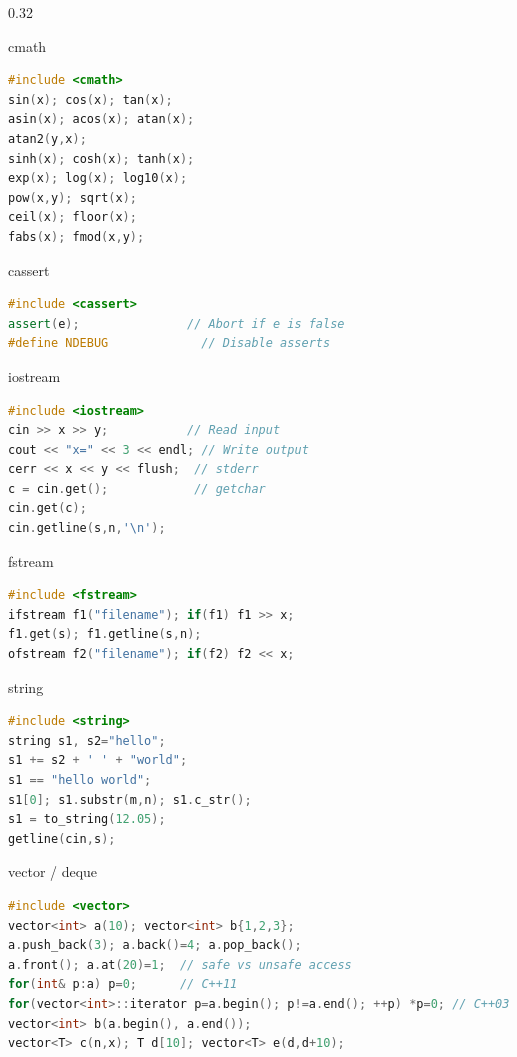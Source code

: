 \documentclass[final]{beamer}
\begin{document}
\begin{frame}[t,fragile]
\begin{columns}[t,totalwidth=\paperwidth, colsep=0.015\paperwidth]
\begin{column}{0.32\paperwidth}
\begin{block}{cmath}
\begin{lstlisting}[language=C++]
#include <cmath>
sin(x); cos(x); tan(x);
asin(x); acos(x); atan(x);
atan2(y,x);
sinh(x); cosh(x); tanh(x);
exp(x); log(x); log10(x);
pow(x,y); sqrt(x);
ceil(x); floor(x);
fabs(x); fmod(x,y);
\end{lstlisting}


\end{block}



\begin{block}{cassert}
\begin{lstlisting}[language=C++]
#include <cassert>
assert(e);               // Abort if e is false
#define NDEBUG             // Disable asserts
\end{lstlisting}
\end{block}

\begin{block}{iostream}
\begin{lstlisting}[language=C++]
#include <iostream>
cin >> x >> y;           // Read input
cout << "x=" << 3 << endl; // Write output
cerr << x << y << flush;  // stderr
c = cin.get();            // getchar
cin.get(c);
cin.getline(s,n,'\n');
\end{lstlisting}
\end{block}

\begin{block}{fstream}
\begin{lstlisting}[language=C++]
#include <fstream>
ifstream f1("filename"); if(f1) f1 >> x;
f1.get(s); f1.getline(s,n);
ofstream f2("filename"); if(f2) f2 << x;
\end{lstlisting}
\end{block}

\begin{block}{string}
\begin{lstlisting}[language=C++]
#include <string>
string s1, s2="hello";
s1 += s2 + ' ' + "world";
s1 == "hello world";
s1[0]; s1.substr(m,n); s1.c_str();
s1 = to_string(12.05);
getline(cin,s);
\end{lstlisting}
\end{block}

\begin{block}{vector / deque}
\begin{lstlisting}[language=C++]
#include <vector>
vector<int> a(10); vector<int> b{1,2,3};
a.push_back(3); a.back()=4; a.pop_back();
a.front(); a.at(20)=1;  // safe vs unsafe access
for(int& p:a) p=0;      // C++11
for(vector<int>::iterator p=a.begin(); p!=a.end(); ++p) *p=0; // C++03
vector<int> b(a.begin(), a.end());
vector<T> c(n,x); T d[10]; vector<T> e(d,d+10);


\end{lstlisting}
\end{block}
\end{column}
\end{columns}
\end{frame}
\end{document}
